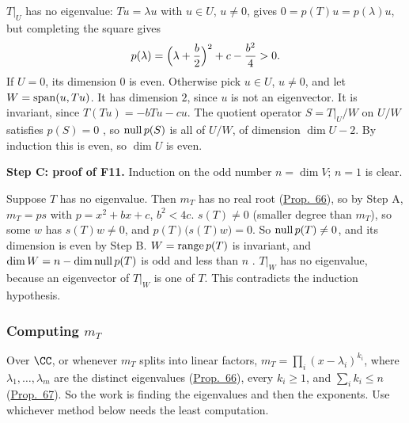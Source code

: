 \documentclass[10pt]{scrartcl}
\begin{document}
\begin{steps}
  \ii $T|_U$ has no eigenvalue: $Tu=\lambda u$ with $u\in U$, $u\ne0$, gives $0=p(T)u=p(\lambda)u$, but completing the square gives
  \[ p(\lambda)=\Bigl(\lambda+\frac b2\Bigr)^2+c-\frac{b^2}4>0. \]
  \ii If $U=0$, its dimension $0$ is even. Otherwise pick $u\in U$, $u\ne0$, and let $W=\operatorname{span}(u,Tu)$. It has dimension $2$, since $u$ is not an eigenvector. It is invariant, since $T(Tu)=-bTu-cu$.
  \ii The quotient operator $S=T|_U/W$ on $U/W$ satisfies $p(S)=0$ , so $\operatorname{null} p(S)$ is all of $U/W$, of dimension $\dim U-2$. By induction this is even, so $\dim U$ is even.
\end{steps}
\textbf{Step C: proof of F11.} Induction on the odd number $n=\dim V$; $n=1$ is clear.
\begin{steps}
  \ii Suppose $T$ has no eigenvalue. Then $m_T$ has no real root (\hyperref[prop-66]{Prop.~66}), so by Step A, $m_T=ps$ with $p=x^2+bx+c$, $b^2<4c$.
  \ii $s(T)\ne0$ (smaller degree than $m_T$), so some $w$ has $s(T)w\ne0$, and $p(T)\bigl(s(T)w\bigr)=0$. So $\operatorname{null} p(T)\ne0$, and its dimension is even by Step B.
  \ii $W=\operatorname{range} p(T)$ is invariant, and $\dim W=n-\dim\operatorname{null} p(T)$ is odd and less than $n$ . $T|_W$ has no eigenvalue, because an eigenvector of $T|_W$ is one of $T$. This contradicts the induction hypothesis.
\end{steps}


\subsubsection*{Computing $m_T$}
Over $\CC$, or whenever $m_T$ splits into linear factors, $m_T=\prod_i(x-\lambda_i)^{k_i}$, where $\lambda_1,\dots,\lambda_m$ are the distinct eigenvalues (\hyperref[prop-66]{Prop.~66}), every $k_i\ge1$, and $\sum_ik_i\le n$ (\hyperref[prop-67]{Prop.~67}). So the work is finding the eigenvalues and then the exponents. Use whichever method below needs the least computation.
\end{document}

